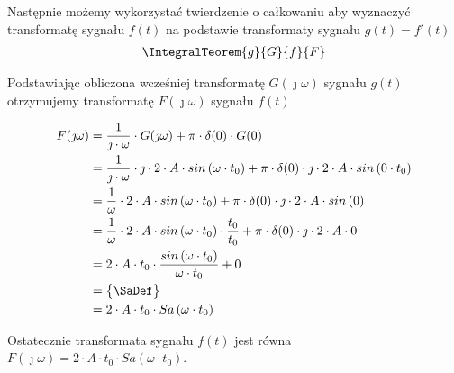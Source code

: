 \begin{task}
Następnie możemy wykorzystać twierdzenie o całkowaniu aby wyznaczyć transformatę sygnału $f(t)$ na podstawie transformaty sygnału $g(t)=f'(t)$
\begin{align*}
\IntegralTeorem{g}{G}{f}{F}
\end{align*}

Podstawiając obliczona wcześniej transformatę $G(\jmath \omega)$ sygnału $g(t)$ otrzymujemy transformatę $F(\jmath \omega)$ sygnału $f(t)$

\begin{align*}
F(\jmath \omega) &= \frac{1}{\jmath \cdot \omega} \cdot G(\jmath \omega) + \pi \cdot \delta(0) \cdot G(0)\\
&=\frac{1}{\jmath \cdot \omega} \cdot \jmath \cdot 2 \cdot A \cdot sin\left( \omega \cdot t_0\right) + \pi \cdot \delta(0) \cdot \jmath \cdot 2 \cdot A \cdot sin\left( 0 \cdot t_0\right)\\
&=\frac{1}{\omega} \cdot 2 \cdot A \cdot sin\left( \omega \cdot t_0\right) + \pi \cdot \delta(0) \cdot \jmath \cdot 2 \cdot A \cdot sin\left( 0\right)\\
&=\frac{1}{\omega} \cdot 2 \cdot A \cdot sin\left( \omega \cdot t_0\right) \cdot \frac{t_0}{t_0} + \pi \cdot \delta(0) \cdot \jmath \cdot 2 \cdot A \cdot 0\\
&= 2 \cdot A \cdot t_0 \cdot \frac{sin\left( \omega \cdot t_0\right)}{\omega \cdot t_0} + 0\\
&=\begin{Bmatrix}
\SaDef
\end{Bmatrix}\\
&= 2 \cdot A \cdot t_0 \cdot Sa\left( \omega \cdot t_0\right)\\
\end{align*}

Ostatecznie transformata sygnału $f(t)$ jest równa $F(\jmath \omega)=2 \cdot A \cdot t_0 \cdot Sa\left( \omega \cdot t_0\right)$.
\end{task}

